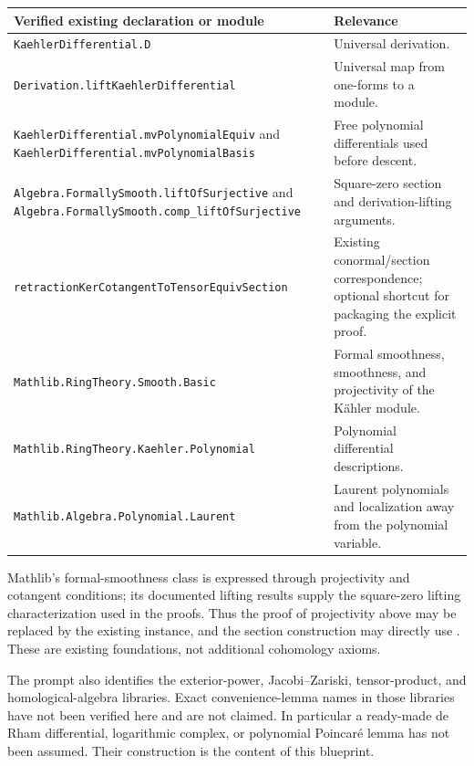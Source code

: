 \documentclass[11pt]{article}
\newcommand{\planned}[1]{\texttt{\detokenize{#1}}}
\theoremstyle{definition}
\theoremstyle{remark}
\begin{document}
{\small
\begin{longtable}{@{}p{}p{}@{}}
\toprule
Verified existing declaration or module & Relevance\\\midrule\endhead
\nolinkurl{KaehlerDifferential.D} &
Universal derivation.\\
\nolinkurl{Derivation.liftKaehlerDifferential} &
Universal map from one-forms to a module.\\
\nolinkurl{KaehlerDifferential.mvPolynomialEquiv} and
\nolinkurl{KaehlerDifferential.mvPolynomialBasis} &
Free polynomial differentials used before descent.\\
\nolinkurl{Algebra.FormallySmooth.liftOfSurjective} and
\nolinkurl{Algebra.FormallySmooth.comp_liftOfSurjective} &
Square-zero section and derivation-lifting arguments.\\
\nolinkurl{retractionKerCotangentToTensorEquivSection} &
Existing conormal/section correspondence; optional shortcut for packaging the explicit proof.\\
\nolinkurl{Mathlib.RingTheory.Smooth.Basic} &
Formal smoothness, smoothness, and projectivity of the K\"ahler module.\\
\nolinkurl{Mathlib.RingTheory.Kaehler.Polynomial} &
Polynomial differential descriptions.\\
\nolinkurl{Mathlib.Algebra.Polynomial.Laurent} &
Laurent polynomials and localization away from the polynomial variable.\\
\bottomrule
\end{longtable}
}
Mathlib's formal-smoothness class is expressed through projectivity and cotangent conditions; its documented lifting results supply the square-zero lifting characterization used in the proofs. Thus the proof of projectivity above may be replaced by the existing instance, and the section construction may directly use \planned{liftOfSurjective}. These are existing foundations, not additional cohomology axioms.

The prompt also identifies the exterior-power, Jacobi--Zariski, tensor-product, and homological-algebra libraries. Exact convenience-lemma names in those libraries have not been verified here and are not claimed. In particular a ready-made de Rham differential, logarithmic complex, or polynomial Poincar\'e lemma has not been assumed. Their construction is the content of this blueprint.
\end{document}
